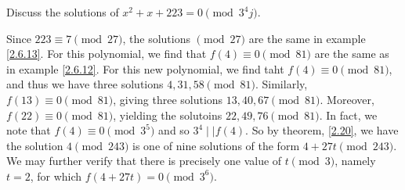 \documentclass[11pt]{article}
\begin{document}
\begin{example}\label{2.6.13}
	Discuss the solutions of \(x^2 + x + 223 = 0 \pmod{3^4j}\).
\end{example}
\begin{solution}
Since \(223 \equiv 7 \pmod{27}\), the solutions \(\pmod{27}\) are the same in example \cref{2.6.13}. For this polynomial, we find that \(f(4) \equiv 0 \pmod{81}\) are the same as in example \cref{2.6.12}. For this new polynomial, we find taht \(f(4) \equiv 0 \pmod{81}\), and thus we have three solutions \(4, 31, 58 \pmod{81}\). Similarly, \(f(13) \equiv 0 \pmod{81}\), giving three solutions \(13, 40, 67\pmod{81}\). Moreover, \(f(22)\equiv 0 \pmod{81}\), yielding the solutoins \(22, 49, 76 \pmod{81}\). In fact, we note that \(f(4)\equiv 0\pmod{3^5}\) and so \(3^4 \mid\mid f(4)\). So by theorem, \cref{2.20}, we have the  solution \(4 \pmod{243}\) is one of nine solutions of the form \(4 + 27t \pmod{243}\). We may further verify that there is precisely one value of \(t \pmod{3}\), namely \(t = 2\), for which \(f(4 + 27t) = 0 \pmod{3^6}\).

\end{solution}
\end{document}
